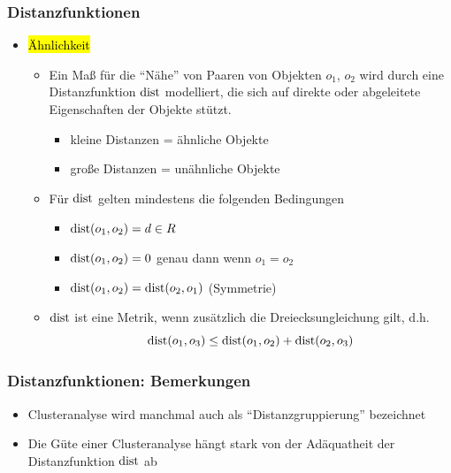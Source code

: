 \begin{frame}%
\frametitle{Distanzfunktionen}

\begin{itemize}
\item \hl{Ähnlichkeit}
\begin{itemize}
\item Ein Maß für die "`Nähe"' von Paaren von Objekten $o_1$, $o_2$
  wird durch eine Distanzfunktion $\operatorname{dist}$ modelliert, die sich auf
  direkte oder abgeleitete Eigenschaften  der Objekte stützt.  
\begin{itemize}
\item kleine Distanzen = ähnliche Objekte 
\item große Distanzen = unähnliche Objekte 
\end{itemize}
\item Für $\operatorname{dist}$ gelten mindestens die folgenden Bedingungen 
\begin{itemize}
\item $\operatorname{dist}(o_1, o_2) = d \in R$ 
\item $\operatorname{dist}(o_1, o_2) = 0$ genau dann wenn $o_1=o_2$ 
\item $\operatorname{dist}(o_1, o_2) = \operatorname{dist}(o_2,o_1)$ (Symmetrie) 
\end{itemize}
\item $\operatorname{dist}$ ist eine Metrik, wenn zusätzlich die Dreiecksungleichung
  gilt, d.h.  
$$\operatorname{dist}(o_1,o_3) \leq \operatorname{dist}(o_1,o_2) + \operatorname{dist}(o_2, o_3) $$
\end{itemize}
\end{itemize}

\end{frame}


\begin{frame}%
\frametitle{Distanzfunktionen: Bemerkungen}

\begin{itemize}
\item Clusteranalyse wird manchmal auch als "`Distanzgruppierung"'
  bezeichnet   
\item Die Güte einer Clusteranalyse hängt stark von der Adäquatheit
  der Distanzfunktion $\operatorname{dist}$ ab 
\end{itemize}

\end{frame}


